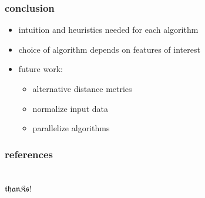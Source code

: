 \begin{frame}
\frametitle{conclusion}

	\begin{itemize}
		\setlength{\itemindent}{3em}
		\item intuition and heuristics needed for each algorithm
		\item choice of algorithm depends on features of interest
		\item future work:
		\begin{itemize}
			\setlength{\itemindent}{3em}
			\item alternative distance metrics
			\item normalize input data
			\item parallelize algorithms
		\end{itemize}
	\end{itemize}

\end{frame}

\begin{frame}[shrink=20]

	\frametitle{references}
	
	

\end{frame}

\begingroup
{}
\begin{frame}[plain]

	\frametitle{}
	\centering\Huge\color{Red}
	\vfill
	~\\
	$\mathfrak{thanKs!}$
	\vfill

\end{frame}
\endgroup